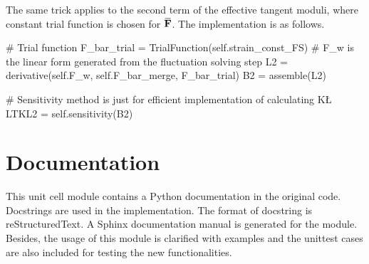 \documentclass[10pt,a4paper]{scrreprt}
\newcommand{\overbar}[1]{\mkern 1.5mu\overline{\mkern-1.5mu#1\mkern-1.5mu}\mkern 1.5mu}
\begin{document}
The same trick applies to the second term of the effective tangent moduli, where constant trial function is chosen for $\overbar{\mathbf{F}}$. The implementation is as follows. 
\begin{python}
# Trial function
F_bar_trial = TrialFunction(self.strain_const_FS)
# F_w is the linear form generated from the fluctuation solving step
L2 = derivative(self.F_w, self.F_bar_merge, F_bar_trial)
B2 = assemble(L2)

# Sensitivity method is just for efficient implementation of calculating K\L
LTKL2 = self.sensitivity(B2)
\end{python}

\section{Documentation}
This unit cell module contains a Python documentation in the original code. Docstrings are used in the implementation. The format of docstring is reStructuredText. A Sphinx documentation manual is generated for the module. Besides, the usage of this module is clarified with examples and the unittest cases are also included for testing the new functionalities.
\end{document}
